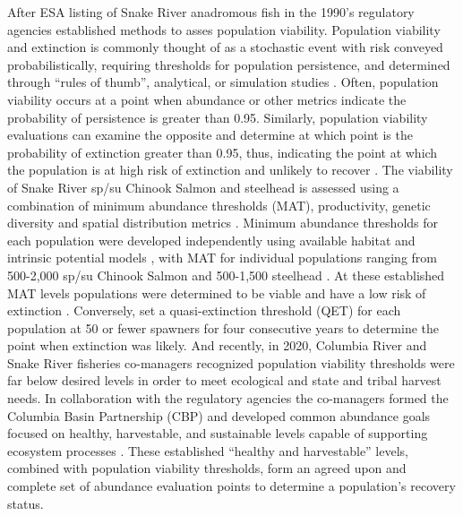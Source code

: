 \documentclass[10pt,a4paper]{article}
\begin{document}
After ESA listing of Snake River anadromous fish in the 1990's regulatory agencies established methods to asses population viability. Population viability and extinction is commonly thought of as a stochastic event with risk conveyed probabilistically, requiring thresholds for population persistence, and determined through ``rules of thumb'', analytical, or simulation studies \autocite{thompson_determining_1991}. Often, population viability occurs at a point when abundance or other metrics indicate the probability of persistence is greater than 0.95. Similarly, population viability evaluations can examine the opposite and determine at which point is the probability of extinction greater than 0.95, thus, indicating the point at which the population is at high risk of extinction and unlikely to recover \autocite{thompson_determining_1991}. The viability of Snake River sp/su Chinook Salmon and steelhead is assessed using a combination of minimum abundance thresholds (MAT), productivity, genetic diversity and spatial distribution metrics \autocite{mcelhany_viable_2000,ictrt_viability_2007}. Minimum abundance thresholds for each population were developed independently using available habitat and intrinsic potential models \autocite{cooney_appendix_2006}, with MAT for individual populations ranging from 500-2,000 sp/su Chinook Salmon and 500-1,500 steelhead \autocite{ictrt_viability_2007}. At these established MAT levels populations were determined to be viable and have a low risk of extinction \autocite{noaa_esa_2017}. Conversely, \autocite{ictrt_viability_2007} set a quasi-extinction threshold (QET) for each population at 50 or fewer spawners for four consecutive years to determine the point when extinction was likely. And recently, in 2020, Columbia River and Snake River fisheries co-managers recognized population viability thresholds were far below desired levels in order to meet ecological and state and tribal harvest needs. In collaboration with the regulatory agencies the co-managers formed the Columbia Basin Partnership (CBP) and developed common abundance goals focused on healthy, harvestable, and sustainable levels capable of supporting ecosystem processes \autocite{cbp_vision_2020}. These established ``healthy and harvestable'' levels, combined with population viability thresholds, form an agreed upon and complete set of abundance evaluation points to determine a population's recovery status.
\end{document}
